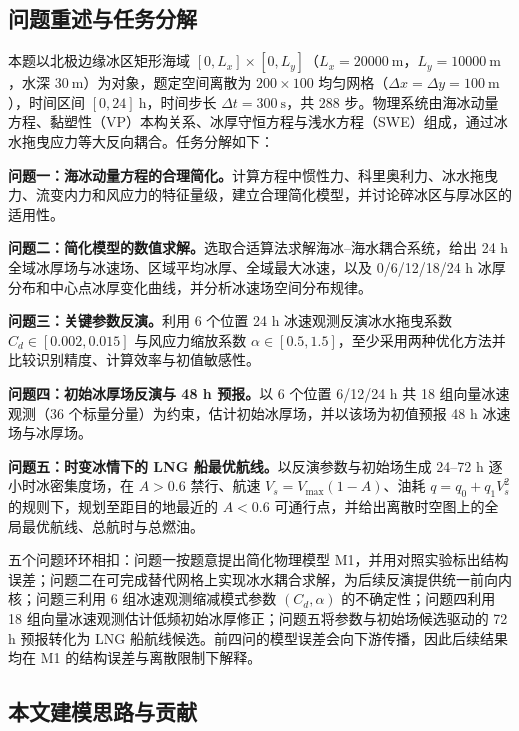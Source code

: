 \documentclass[UTF8,fontset=none]{ctexart}
\begin{document}
\subsection{问题重述与任务分解}

本题以北极边缘冰区矩形海域 $[0,L_x]\times[0,L_y]$（$L_x=20000\ \mathrm m$，$L_y=10000\ \mathrm m$，水深 $30\ \mathrm m$）为对象，题定空间离散为 $200\times100$ 均匀网格（$\Delta x=\Delta y=100\ \mathrm m$），时间区间 $[0,24]\ \mathrm h$，时间步长 $\Delta t=300\ \mathrm s$，共 $288$ 步。物理系统由海冰动量方程、黏塑性（VP）本构关系、冰厚守恒方程与浅水方程（SWE）组成，通过冰水拖曳应力等大反向耦合。任务分解如下：

\par \textbf{问题一：海冰动量方程的合理简化。}计算方程中惯性力、科里奥利力、冰水拖曳力、流变内力和风应力的特征量级，建立合理简化模型，并讨论碎冰区与厚冰区的适用性。

\par \textbf{问题二：简化模型的数值求解。}选取合适算法求解海冰--海水耦合系统，给出 24 h 全域冰厚场与冰速场、区域平均冰厚、全域最大冰速，以及 0/6/12/18/24 h 冰厚分布和中心点冰厚变化曲线，并分析冰速场空间分布规律。

\par \textbf{问题三：关键参数反演。}利用 6 个位置 24 h 冰速观测反演冰水拖曳系数 $C_d\in[0.002,0.015]$ 与风应力缩放系数 $\alpha\in[0.5,1.5]$，至少采用两种优化方法并比较识别精度、计算效率与初值敏感性。

\par \textbf{问题四：初始冰厚场反演与 48 h 预报。}以 6 个位置 6/12/24 h 共 18 组向量冰速观测（36 个标量分量）为约束，估计初始冰厚场，并以该场为初值预报 48 h 冰速场与冰厚场。

\par \textbf{问题五：时变冰情下的 LNG 船最优航线。}以反演参数与初始场生成 24--72 h 逐小时冰密集度场，在 $A>0.6$ 禁行、航速 $V_s=V_{\max}(1-A)$、油耗 $q=q_0+q_1V_s^2$ 的规则下，规划至距目的地最近的 $A<0.6$ 可通行点，并给出离散时空图上的全局最优航线、总航时与总燃油。

\par 五个问题环环相扣：问题一按题意提出简化物理模型 M1，并用对照实验标出结构误差；问题二在可完成替代网格上实现冰水耦合求解，为后续反演提供统一前向内核；问题三利用 6 组冰速观测缩减模式参数 $(C_d,\alpha)$ 的不确定性；问题四利用 18 组向量冰速观测估计低频初始冰厚修正；问题五将参数与初始场候选驱动的 72 h 预报转化为 LNG 船航线候选。前四问的模型误差会向下游传播，因此后续结果均在 M1 的结构误差与离散限制下解释。

\subsection{本文建模思路与贡献}
\end{document}

